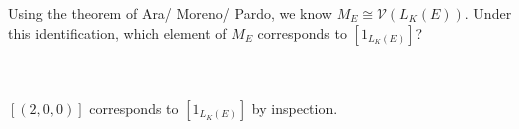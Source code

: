 Using the theorem of Ara/ Moreno/ Pardo, we know $M_E\cong\mathcal{V}(L_K(E))$. Under this
identification, which element of $M_E$ corresponds to $[1_{L_K(E)}]$?\\\\

\begin{solution}\renewcommand{\qedsymbol}{}\ \\
    $[(2,0,0)]$ corresponds to $[1_{L_K(E)}]$ by inspection.
\end{solution}